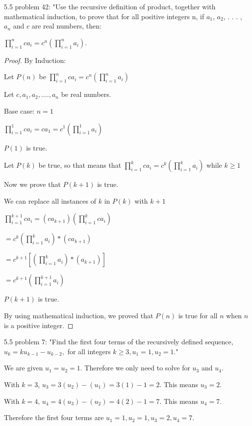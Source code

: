 \documentclass{article}
\begin{document}
\item 5.5 problem 42: "Use the recursive definition of product, together with mathematical induction, to prove that for all positive integers n, if $a_1$, $a_2$, . . . , $a_n$ and $c$ are real numbers, then:

\item ${\displaystyle \prod_{i=1}^{n} ca_i} = c^{n} ({\displaystyle \prod_{i=1}^{n} a_i})$.

\begin{proof}
    \caption{By Induction:} Let $P(n)$ be ${\displaystyle \prod_{i=1}^{n} ca_i} = c^{n} ({\displaystyle \prod_{i=1}^{n} a_i})$

Let $c, a_1, a_2, ...., a_n$ be real numbers. 

Base case: $n = 1$

${\displaystyle \prod_{i=1}^{1} ca_i} = ca_1 = c^{1} ({\displaystyle \prod_{i=1}^{1} a_i})$

$P(1)$ is true.

Let $P(k)$ be true, so that means that ${\displaystyle \prod_{i=1}^{k} ca_i} = c^{k} ({\displaystyle \prod_{i=1}^{k} a_i})$  while $k \geq 1$

Now we prove that $P(k + 1)$ is true.

We can replace all instances of $k$ in $P(k)$ with $k+1$

${\displaystyle \prod_{i=1}^{k+1} ca_i} = (ca_{k+1}) ({\displaystyle \prod_{i=1}^{k} ca_i})$

$= c^{k} ({\displaystyle \prod_{i=1}^{k} a_i}) * (ca_{k+1})$

$= c^{k+1} [({\displaystyle \prod_{i=1}^{k} a_i}) * (a_{k+1})]$

$= c^{k+1} ({\displaystyle \prod_{i=1}^{k+1} a_i})$

$P(k+1)$ is true.

By using mathematical induction, we proved that $P(n)$ is true for all $n$ when $n$ is a positive integer.
\end{proof}



\clearpage
\header

\item 5.5 problem 7: "Find the first four terms of  the recursively defined sequence, $u_k = ku_{k-1} - u_{k-2},$ for all integers $k \geq 3, u_1 = 1, u_2 = 1$."

\item We are given $u_1 = u_2 = 1.$ Therefore we only need to solve for $u_3$ and $u_4$.
\item With $k = 3$, $u_3 = 3(u_2) - (u_1) = 3(1) - 1 = 2$. This means $u_3 = 2$.
\item With $k = 4$, $u_4 = 4(u_3) - (u_2) = 4(2) - 1 = 7$. This means $u_4 = 7$.
\item Therefore the first four terms are $u_1 = 1, u_2 = 1, u_3 = 2, u_4 = 7$.
\end{document}
